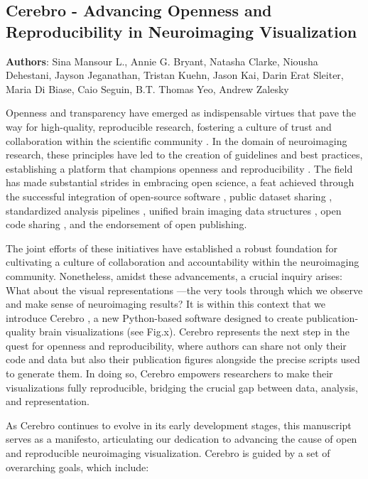 \documentclass{article}
\begin{document}
\subsection{Cerebro - Advancing Openness and Reproducibility in Neuroimaging Visualization}
\textbf{Authors}: Sina Mansour L., Annie G. Bryant, Natasha Clarke, Niousha Dehestani, Jayson Jeganathan, Tristan Kuehn, Jason Kai, Darin Erat Sleiter, Maria Di Biase, Caio Seguin, B.T. Thomas Yeo, Andrew Zalesky

Openness and transparency have emerged as indispensable virtues that pave the way for high-quality, reproducible research, fostering a culture of trust and collaboration within the scientific community \cite{munafo2017manifesto}. In the domain of neuroimaging research, these principles have led to the creation of guidelines and best practices, establishing a platform that champions openness and reproducibility \cite{niso2022open}. The field has made substantial strides in embracing open science, a feat achieved through the successful integration of open-source software \cite{gorgolewski2011nipype}, public dataset sharing \cite{markiewicz2021openneuro}, standardized analysis pipelines \cite{nichols2017}, unified brain imaging data structures \cite{gorgolewski2016}, open code sharing \cite{smout2021open}, and the endorsement of open publishing.

The joint efforts of these initiatives have established a robust foundation for cultivating a culture of collaboration and accountability within the neuroimaging community. Nonetheless, amidst these advancements, a crucial inquiry arises: What about the visual representations —the very tools through which we observe and make sense of neuroimaging results? It is within this context that we introduce Cerebro \cite{sina_mansour_l_2023_8238773}, a new Python-based software designed to create publication-quality brain visualizations (see Fig.x). Cerebro represents the next step in the quest for openness and reproducibility, where authors can share not only their code and data but also their publication figures alongside the precise scripts used to generate them. In doing so, Cerebro empowers researchers to make their visualizations fully reproducible, bridging the crucial gap between data, analysis, and representation.

As Cerebro continues to evolve in its early development stages, this manuscript serves as a manifesto, articulating our dedication to advancing the cause of open and reproducible neuroimaging visualization. Cerebro is guided by a set of overarching goals, which include:
\end{document}
